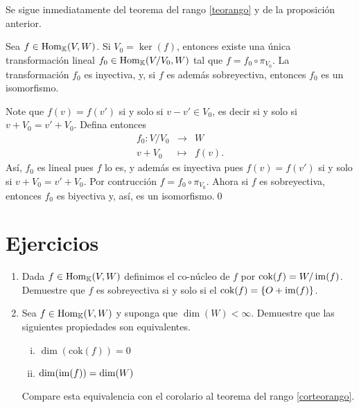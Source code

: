 \dem Se sigue inmediatamente del teorema del rango \ref{teorango} y de la proposición anterior.

\begin{teo}
Sea $f\in\operatorname{Hom}_\mathbb{K}(V,W)$. Si $V_0=\ker(f)$, entonces existe una \'unica transformaci\'on lineal $f_0\in\operatorname{Hom}_\mathbb{K}(V/V_0,W)$ tal que $f=f_0\circ\pi_{V_0}$. La transformaci\'on $f_{0}$ es inyectiva, y, si $f$ es adem\'as sobreyectiva, entonces $f_{0}$ es un isomorfismo.
\end{teo}

\dem Note que $f(v)=f(v')$ si y solo si $v-v'\in V_0$, es decir si y solo si $v+V_0=v'+V_0$. Defina entonces
\begin{eqnarray*}
f_{0}: V/V_0 & \longrightarrow & W\\
            v+V_0 & \longmapsto      & f(v).
\end{eqnarray*}
As\'i, $f_{0}$ es lineal pues $f$ lo es, y adem\'as es inyectiva pues $f(v)=f(v')$ si y solo si $v+V_0=v'+V_0$. Por contrucci\'on $f=f_{0}\circ\pi_{V_0}$. Ahora si $f$ es sobreyectiva, entonces $f_{0}$ es biyectiva y, as\'i, es un isomorfismo.\qed

\section*{Ejercicios}
\begin{enumerate}
  \item Dada $f\in\operatorname{Hom}_\mathbb{K}(V,W)$ definimos el co-núcleo de $f$ por $\text{cok}(f)=W/\operatorname{im}(f)$. Demuestre que $f$ es sobreyectiva si y solo si el $\text{cok}(f)=\{O+\operatorname{im}(f)\}$.
  \item Sea $f\in\operatorname{Hom}_\mathbb{K}(V,W)$ y suponga que $\dim(W)<\infty$. Demuestre que las siguientes propiedades son equivalentes.
    \begin{enumerate}[(i)]
      \item $\dim(\text{cok}(f))=0$
      \item $\dim(\operatorname{im}(f))=\dim(W)$
    \end{enumerate}
  Compare esta equivalencia con el corolario al teorema del rango \ref{corteorango}.
\end{enumerate}